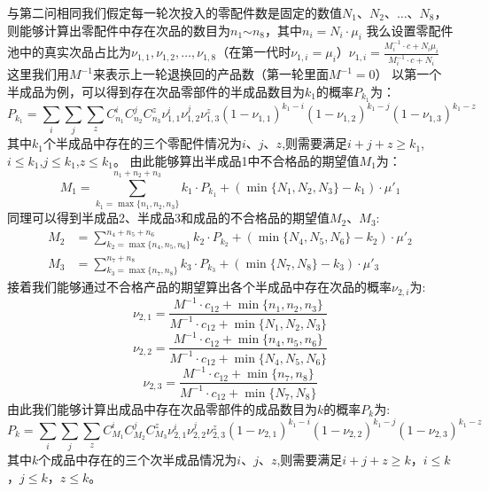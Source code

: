 \documentclass[withoutpreface,bwprint]{cumcmthesis} %
\begin{document}
与第二问相同我们假定每一轮次投入的零配件数是固定的数值$N_{1}$、$N_{2}$、$\dots$、$N_{8}$，则能够计算出零配件中存在次品的数目为$n_{1}$$\sim$$n_{8}$，其中$n_{i}=N_{i}\cdot\mu_{i}$
		我么设置零配件池中的真实次品占比为$\nu_{1,1},\nu_{1,2},\dots,\nu_{1,8}$（在第一代时$\nu_{1,i}=\mu_{i}$）$\nu_{1,i}=\frac{M_{i}^{-1}\cdot c+N_{i}\mu_{i}}{M_{i}^{-1}\cdot c+N_{i}}$
这里我们用$M^{-1}$来表示上一轮退换回的产品数（第一轮里面$M^{-1}=0$）
以第一个半成品为例，可以得到存在次品零部件的半成品数目为$k_{1}$的概率$P_{k_{1}}$为：
\begin{equation}
	P_{k_{1}}=\sum_{i}\sum_{j}\sum_{z}C_{n_{1}}^{i}C_{n_{2}}^{j}C_{n_{3}}^{z}\nu_{1,1}^{i}\nu_{1,2}^{j}\nu_{1,3}^{z}(1-\nu_{1,1})^{k_{1}-i}(1-\nu_{1,2})^{k_{1}-j}(1-\nu_{1,3})^{k_{1}-z}
	\label{eq:6}
\end{equation}
其中$k_{1}$个半成品中存在的三个零配件情况为$i$、$j$、$z$,则需要满足$i+j+z \ge k_{1}$,$i\le k_{1}$,$j\le k_{1}$,$z\le k_{1}$。
由此能够算出半成品1中不合格品的期望值$M_{1}$为：
\begin{equation}
	M_{1}=\sum_{k_{1}=\max \{n_{1},n_{2},n_{3}\}}^{n_{1}+n_{2}+n_{3}}k_{1}\cdot P_{k_{1}}+(\min \{N_{1},N_{2},N_{3}\}-k_{1})\cdot \mu'_{1}
	\label{eq:7}
\end{equation}
同理可以得到半成品2、半成品3和成品的不合格品的期望值$M_{2}$、$M_{3}$:
\begin{align}
	M_{2} & =\sum_{k_{2}=\max \{n_{4},n_{5},n_{6}\}}^{n_{4}+n_{5}+n_{6}}k_{2}\cdot P_{k_{2}}+(\min \{N_{4},N_{5},N_{6}\}-k_{2})\cdot \mu'_{2} \\
	M_{3} & =\sum_{k_{3}=\max \{n_{7},n_{8}\}}^{n_{7}+n_{8}}k_{3}\cdot P_{k_{3}}+(\min \{N_{7},N_{8}\}-k_{3})\cdot \mu'_{3}
	\label{eq:8}
\end{align}
接着我们能够通过不合格产品的期望算出各个半成品中存在次品的概率$\nu_{2,i}$为:
$$\nu_{2,1}=\frac{M^{-1}\cdot c_{12}+\min \{ n_{1},n_{2},n_{3}\}}{M^{-1}\cdot c_{12}+\min \{N_{1},N_{2},N_{3}\}}$$
$$\nu_{2,2}=\frac{M^{-1}\cdot c_{12}+\min \{ n_{4},n_{5},n_{6}\}}{M^{-1}\cdot c_{12}+\min \{N_{4},N_{5},N_{6}\}}$$
$$\nu_{2,3}=\frac{M^{-1}\cdot c_{12}+\min \{ n_{7},n_{8}\}}{M^{-1}\cdot c_{12}+\min \{N_{7},N_{8}\}}$$
由此我们能够计算出成品中存在次品零部件的成品数目为$k$的概率$P_{k}$为:
\begin{equation}
	P_{k}=\sum_{i}\sum_{j}\sum_{z}C_{M_{1}}^{i}C_{M_{2}}^{j}C_{M_{3}}^{z}\nu_{2,1}^{i}\nu_{2,2}^{j}\nu_{2,3}^{z}(1-\nu_{2,1})^{k_{1}-i}(1-\nu_{2,2})^{k_{1}-j}(1-\nu_{2,3})^{k_{1}-z}
	\label{eq:9}
\end{equation}
其中$k$个成品中存在的三个次半成品情况为$i$、$j$、$z$,则需要满足$i+j+z \ge k$，$i\le k$，$j\le k$，$z\le k$。
\end{document}

